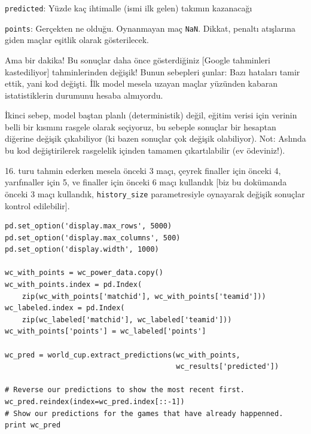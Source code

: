 \documentclass[12pt,fleqn]{article}\usepackage{../../common}
\begin{document}
\verb!predicted!: Yüzde kaç ihtimalle (ismi ilk gelen) takımın kazanacağı

\verb!points!: Gerçekten ne olduğu. Oynanmayan maç \verb!NaN!. Dikkat,
penaltı atışlarına giden maçlar eşitlik olarak gösterilecek.

Ama bir dakika! Bu sonuçlar daha önce gösterdiğiniz [Google tahminleri
kastediliyor] tahminlerinden değişik! Bunun sebepleri şunlar: Bazı hataları
tamir ettik, yani kod değişti. İlk model mesela uzayan maçlar yüzünden
kabaran istatistiklerin durumunu hesaba almıyordu.

İkinci sebep, model baştan planlı (deterministik) değil, eğitim verisi için
verinin belli bir kısmını rasgele olarak seçiyoruz, bu sebeple sonuçlar bir
hesaptan diğerine değişik çıkabiliyor (ki bazen sonuçlar çok değişik
olabiliyor). Not: Aslında bu kod değiştirilerek rasgelelik içinden tamamen
çıkartılabilir (ev ödeviniz!).

16. turu tahmin ederken mesela önceki 3 maçı, çeyrek finaller için önceki
4, yarıfınaller için 5, ve finaller için önceki 6 maçı kullandık [biz bu
dokümanda önceki 3 maçı kullandık, \verb!history_size! parametresiyle
oynayarak değişik sonuçlar kontrol edilebilir].

\begin{verbatim}
pd.set_option('display.max_rows', 5000)
pd.set_option('display.max_columns', 500)
pd.set_option('display.width', 1000)

wc_with_points = wc_power_data.copy()
wc_with_points.index = pd.Index(
    zip(wc_with_points['matchid'], wc_with_points['teamid']))
wc_labeled.index = pd.Index(
    zip(wc_labeled['matchid'], wc_labeled['teamid']))
wc_with_points['points'] = wc_labeled['points']

wc_pred = world_cup.extract_predictions(wc_with_points, 
                                        wc_results['predicted'])

# Reverse our predictions to show the most recent first.
wc_pred.reindex(index=wc_pred.index[::-1])
# Show our predictions for the games that have already happenned.
print wc_pred
\end{verbatim}
\end{document}
